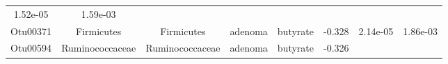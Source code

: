 \documentclass[11pt,]{article}
\begin{document}
\begin{longtable}[]{@{}cccccccc@{}}
\begin{minipage}[t]{0.08\columnwidth}
1.52e-05\strut
\end{minipage} & \begin{minipage}[t]{0.08\columnwidth}\centering\strut
1.59e-03\strut
\end{minipage}\tabularnewline
\begin{minipage}[t]{0.08\columnwidth}\centering\strut
Otu00371\strut
\end{minipage} & \begin{minipage}[t]{0.15\columnwidth}\centering\strut
Firmicutes\strut
\end{minipage} & \begin{minipage}[t]{0.15\columnwidth}\centering\strut
Firmicutes\strut
\end{minipage} & \begin{minipage}[t]{0.08\columnwidth}\centering\strut
adenoma\strut
\end{minipage} & \begin{minipage}[t]{0.09\columnwidth}\centering\strut
butyrate\strut
\end{minipage} & \begin{minipage}[t]{0.07\columnwidth}\centering\strut
-0.328\strut
\end{minipage} & \begin{minipage}[t]{0.08\columnwidth}\centering\strut
2.14e-05\strut
\end{minipage} & \begin{minipage}[t]{0.08\columnwidth}\centering\strut
1.86e-03\strut
\end{minipage}\tabularnewline
\begin{minipage}[t]{0.08\columnwidth}\centering\strut
Otu00594\strut
\end{minipage} & \begin{minipage}[t]{0.15\columnwidth}\centering\strut
Ruminococcaceae\strut
\end{minipage} & \begin{minipage}[t]{0.15\columnwidth}\centering\strut
Ruminococcaceae\strut
\end{minipage} & \begin{minipage}[t]{0.08\columnwidth}\centering\strut
adenoma\strut
\end{minipage} & \begin{minipage}[t]{0.09\columnwidth}\centering\strut
butyrate\strut
\end{minipage} & \begin{minipage}[t]{0.07\columnwidth}\centering\strut
-0.326\strut
\end{minipage} & \begin{minipage}[t]{0.08\columnwidth}\centering\strut

\end{minipage}
\end{longtable}
\end{document}
